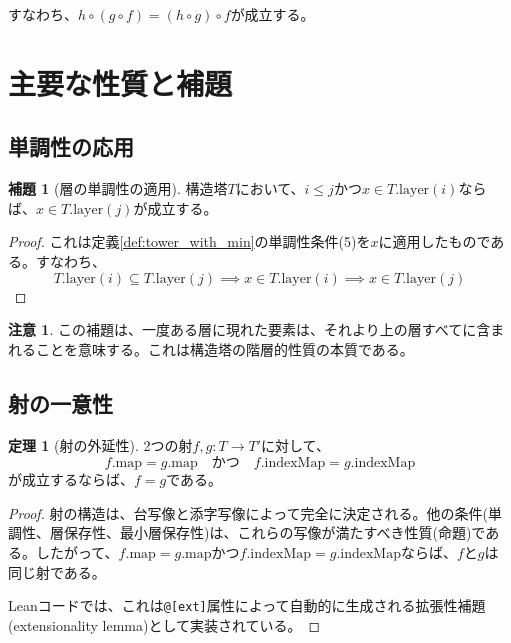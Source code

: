 \documentclass[a4paper,12pt]{article}
\theoremstyle{definition}
\newtheorem{theorem}[definition]{定理}
\newtheorem{lemma}[definition]{補題}
\newtheorem{remark}[definition]{注意}
\begin{document}
すなわち、$h \circ (g \circ f) = (h \circ g) \circ f$が成立する。

\section{主要な性質と補題}

\subsection{単調性の応用}

\begin{lemma}[層の単調性の適用]\label{lem:monotone_applied}
構造塔$T$において、$i \leq j$かつ$x \in T.\text{layer}(i)$ならば、$x \in T.\text{layer}(j)$が成立する。
\end{lemma}

\begin{proof}
これは定義\ref{def:tower_with_min}の単調性条件(5)を$x$に適用したものである。すなわち、
\[
T.\text{layer}(i) \subseteq T.\text{layer}(j) \implies x \in T.\text{layer}(i) \implies x \in T.\text{layer}(j)
\]
\end{proof}

\begin{remark}
この補題は、一度ある層に現れた要素は、それより上の層すべてに含まれることを意味する。これは構造塔の階層的性質の本質である。
\end{remark}

\subsection{射の一意性}

\begin{theorem}[射の外延性]\label{thm:hom_ext}
2つの射$f, g : T \to T'$に対して、
\[
f.\text{map} = g.\text{map} \quad \text{かつ} \quad f.\text{indexMap} = g.\text{indexMap}
\]
が成立するならば、$f = g$である。
\end{theorem}

\begin{proof}
射の構造は、台写像と添字写像によって完全に決定される。他の条件(単調性、層保存性、最小層保存性)は、これらの写像が満たすべき性質(命題)である。したがって、$f.\text{map} = g.\text{map}$かつ$f.\text{indexMap} = g.\text{indexMap}$ならば、$f$と$g$は同じ射である。

Leanコードでは、これは\texttt{@[ext]}属性によって自動的に生成される拡張性補題(extensionality lemma)として実装されている。
\end{proof}
\end{document}

